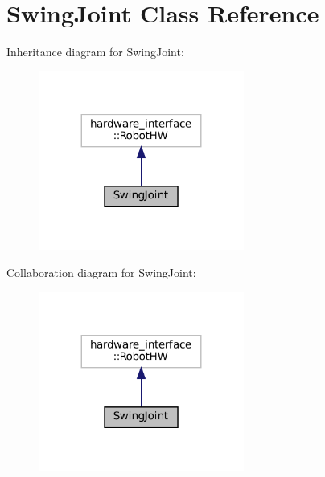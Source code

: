 \hypertarget{classSwingJoint}{}\section{Swing\+Joint Class Reference}
\label{classSwingJoint}


Inheritance diagram for Swing\+Joint\+:\nopagebreak
\begin{figure}[H]
\begin{center}
\leavevmode
\includegraphics[width=191pt]{classSwingJoint__inherit__graph}
\end{center}
\end{figure}


Collaboration diagram for Swing\+Joint\+:\nopagebreak
\begin{figure}[H]
\begin{center}
\leavevmode
\includegraphics[width=191pt]{classSwingJoint__coll__graph}
\end{center}
\end{figure}
